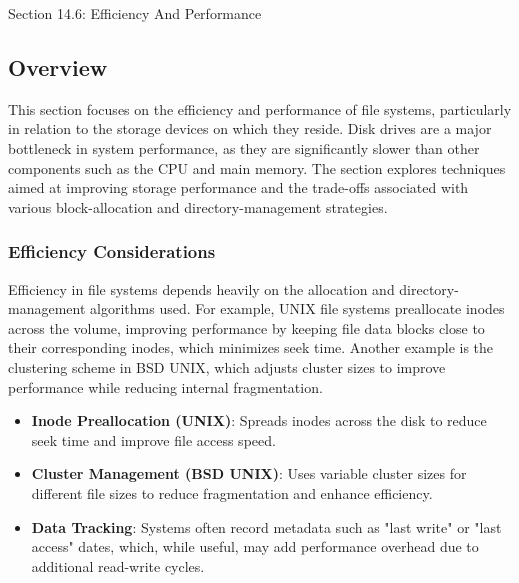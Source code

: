 \begin{notes}{Section 14.6: Efficiency And Performance}
    \subsection*{Overview}

    This section focuses on the efficiency and performance of file systems, particularly in relation to the storage devices on which they reside. Disk drives are a major bottleneck in system performance, 
    as they are significantly slower than other components such as the CPU and main memory. The section explores techniques aimed at improving storage performance and the trade-offs associated with various 
    block-allocation and directory-management strategies.
    
    \subsubsection*{Efficiency Considerations}
    
    Efficiency in file systems depends heavily on the allocation and directory-management algorithms used. For example, UNIX file systems preallocate inodes across the volume, improving performance by 
    keeping file data blocks close to their corresponding inodes, which minimizes seek time. Another example is the clustering scheme in BSD UNIX, which adjusts cluster sizes to improve performance while 
    reducing internal fragmentation.
    
    \begin{highlight}
    
        \begin{itemize}
            \item \textbf{Inode Preallocation (UNIX)}: Spreads inodes across the disk to reduce seek time and improve file access speed.
            \item \textbf{Cluster Management (BSD UNIX)}: Uses variable cluster sizes for different file sizes to reduce fragmentation and enhance efficiency.
            \item \textbf{Data Tracking}: Systems often record metadata such as "last write" or "last access" dates, which, while useful, may add performance overhead due to additional read-write cycles.
        \end{itemize}
    
    \end{highlight}
    

\end{notes}
